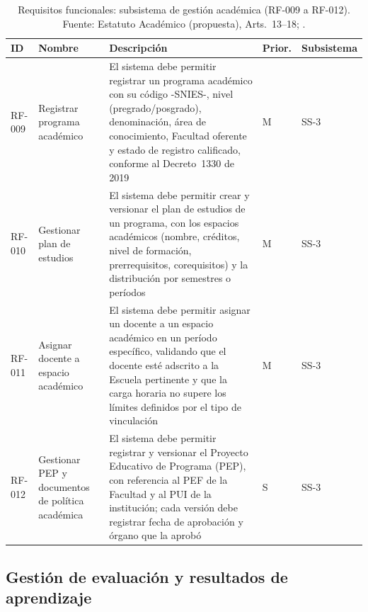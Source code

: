 \begin{longtable}{C{1.4cm} L{2.5cm} L{5cm} C{1.3cm} L{1.8cm}}
  \toprule
  \textbf{ID} & \textbf{Nombre} & \textbf{Descripción} &
  \textbf{Prior.} & \textbf{Subsistema} \\
  \midrule
  \endhead
  \bottomrule
  \caption{Requisitos funcionales: subsistema de gestión académica
    (RF-009 a RF-012). Fuente: Estatuto Académico (propuesta), Arts.\ 13--18;
    \textcite{Decreto1330_2019}.}
  \label{tab:rf-academico}
  \endlastfoot
  RF-009
  & Registrar programa académico
  & El sistema debe permitir registrar un programa académico con su
    código -SNIES-, nivel (pregrado/posgrado), denominación, área de
    conocimiento, Facultad oferente y estado de registro calificado,
    conforme al Decreto~1330 de 2019
  & M
  & SS-3 \\
  \midrule
  RF-010
  & Gestionar plan de estudios
  & El sistema debe permitir crear y versionar el plan de estudios de
    un programa, con los espacios académicos (nombre, créditos, nivel
    de formación, prerrequisitos, corequisitos) y la distribución por
    semestres o períodos
  & M
  & SS-3 \\
  \midrule
  RF-011
  & Asignar docente a espacio académico
  & El sistema debe permitir asignar un docente a un espacio académico
    en un período específico, validando que el docente esté adscrito a
    la Escuela pertinente y que la carga horaria no supere los límites
    definidos por el tipo de vinculación
  & M
  & SS-3 \\
  \midrule
  RF-012
  & Gestionar PEP y documentos de política académica
  & El sistema debe permitir registrar y versionar el Proyecto Educativo
    de Programa (PEP), con referencia al PEF de la Facultad y al PUI
    de la institución; cada versión debe registrar fecha de aprobación
    y órgano que la aprobó
  & S
  & SS-3 \\
\end{longtable}

\subsection{Gestión de evaluación y resultados de aprendizaje}
\label{subsec:req-evaluacion}

